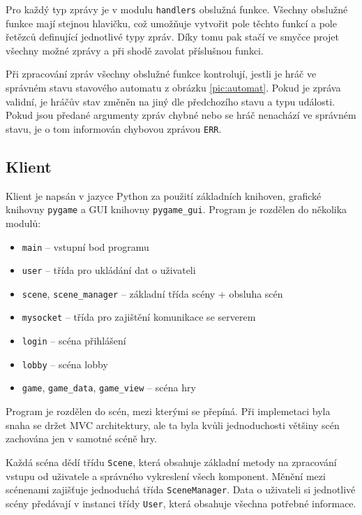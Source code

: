 \documentclass[11pt,a4paper]{article}
\begin{document}
Pro každý typ zprávy je v modulu \texttt{handlers} obslužná funkce. Všechny obslužné funkce mají stejnou hlavičku, což umožňuje vytvořit pole těchto funkcí a pole řetězců definující jednotlivé typy zpráv. Díky tomu pak stačí ve smyčce projet všechny možné zprávy a při shodě zavolat příslušnou funkci.

Při zpracování zpráv všechny obslužné funkce kontrolují, jestli je hráč ve správném stavu stavového automatu z obrázku \ref{pic:automat}. Pokud je zpráva validní, je hráčův stav změněn na jiný dle předchozího stavu a typu události. Pokud jsou předané argumenty zpráv chybné nebo se hráč nenachází ve správném stavu, je o tom informován chybovou zprávou \texttt{ERR}.

\subsection{Klient}
Klient je napsán v jazyce Python za použití základních knihoven, grafické knihovny \texttt{pygame} a GUI knihovny \texttt{pygame\_gui}. Program je rozdělen do několika modulů:

\begin{itemize}
	\item \texttt{main} -- vstupní bod programu
	\item \texttt{user} -- třída pro ukládání dat o uživateli
	\item \texttt{scene}, \texttt{scene\_manager} -- základní třída scény + obsluha scén
	\item \texttt{mysocket} -- třída pro zajištění komunikace se serverem
	\item \texttt{login} -- scéna přihlášení
	\item \texttt{lobby} -- scéna lobby
	\item \texttt{game}, \texttt{game\_data}, \texttt{game\_view} -- scéna hry
\end{itemize}


Program je rozdělen do scén, mezi kterými se přepíná. Při implemetaci byla snaha se držet MVC architektury, ale ta byla kvůli jednoduchosti většiny scén zachována jen v samotné scéně hry. 

Každá scéna dědí třídu \texttt{Scene}, která obsahuje základní metody na zpracování vstupu od uživatele a správného vykreslení všech komponent. Měnění mezi scénenami zajišťuje jednoduchá třída \texttt{SceneManager}. Data o uživateli si jednotlivé scény předávají v instanci třídy \texttt{User}, která obsahuje všechna potřebné informace.
\end{document}
